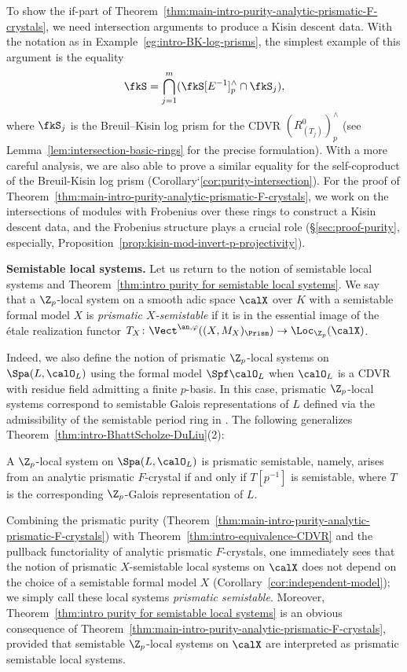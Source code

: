 To show the if-part of Theorem~\ref{thm:main-intro-purity-analytic-prismatic-F-crystals}, we need intersection arguments to produce a Kisin descent data. With the notation as in Example~\ref{eg:intro-BK-log-prisms}, the simplest example of this argument is the equality 
\[
\fkS=\bigcap_{j=1}^m(\fkS[E^{-1}]^\wedge_p\cap\fkS_j),
\]
where $\fkS_j$ is the Breuil--Kisin log prism for the CDVR $(R^0_{(T_j)})^\wedge_p$ (see Lemma~\ref{lem:intersection-basic-rings} for the precise formulation). With a more careful analysis, we are also able to prove a similar equality for the self-coproduct of the Breuil-Kisin log prism (Corollary`\ref{cor:purity-intersection}). For the proof of Theorem~\ref{thm:main-intro-purity-analytic-prismatic-F-crystals}, we work on the intersections of modules with Frobenius over these rings to construct a Kisin descent data, and the Frobenius structure plays a crucial role (\S\ref{sec:proof-purity}, especially, Proposition~\ref{prop:kisin-mod-invert-p-projectivity}).


\medskip \noindent
\textbf{Semistable local systems.}
Let us return to the notion of semistable local systems and Theorem~\ref{thm:intro purity for semistable local systems}. 
We say that a $\Z_p$-local system on a smooth adic space $\calX$ over $K$ with a semistable formal model $X$ is \emph{prismatic $X$-semistable} if it is in the essential image of the \'etale realization functor $T_X\colon \Vect^{\an,\varphi}((X,M_X)_\Prism)\rightarrow \Loc_{\Z_p}(\calX)$. 

Indeed, we also define the notion of prismatic $\Z_p$-local systems on $\Spa(L,\calO_L)$ using the formal model $\Spf \calO_L$ when $\calO_L$ is a CDVR with residue field admitting a finite $p$-basis. In this case, prismatic $\Z_p$-local systems correspond to semistable Galois representations of $L$ defined via the admissibility of the semistable period ring in \cite{fontaine-representations, Morita-imperfsemistable, Ohkubo}. The following generalizes Theorem~\ref{thm:intro-BhattScholze-DuLiu}(2): 

\begin{thm} \label{thm:intro-equivalence-CDVR}
A $\Z_p$-local system on $\Spa(L,\calO_L)$ is prismatic semistable, namely, arises from an analytic prismatic $F$-crystal if and only if $T[p^{-1}]$ is semistable, where $T$ is the corresponding $\Z_p$-Galois representation of $L$.    
\end{thm}

Combining the prismatic purity (Theorem~\ref{thm:main-intro-purity-analytic-prismatic-F-crystals}) with Theorem~\ref{thm:intro-equivalence-CDVR} and the pullback functoriality of analytic prismatic $F$-crystals, one immediately sees that the notion of prismatic $X$-semistable local systems on $\calX$ does not depend on the choice of a semistable formal model $X$ (Corollary~\ref{cor:independent-model}); we simply call these local systems \emph{prismatic semistable}. Moreover, Theorem~\ref{thm:intro purity for semistable local systems} is an obvious consequence of Theorem~\ref{thm:main-intro-purity-analytic-prismatic-F-crystals}, provided that semistable $\Z_p$-local systems on $\calX$ are interpreted as prismatic semistable local systems.

